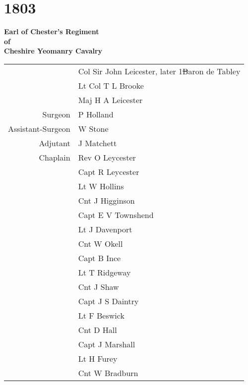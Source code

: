 \chapter*{1803}

\vspace*{10mm}

\begin{center}
  \Large
  \textbf{Earl of Chester's Regiment \\ of \\ Cheshire Yeomanry Cavalry}
\end{center}

\vspace*{10mm}

\begin{center}
  \begin{tabular}{rl}
    & Col Sir John Leicester, later 1\st Baron de Tabley \\
    & Lt Col T L Brooke \\
    & Maj H A Leicester \\
    Surgeon & P Holland \\
    Assistant-Surgeon & W Stone \\
    Adjutant & J Matchett \\
    Chaplain & Rev O Leycester \\
    & Capt R Leycester \\
    & Lt W Hollins \\
    & Cnt J Higginson \\
    & Capt E V Townshend \\
    & Lt J Davenport \\
    & Cnt W Okell \\
    & Capt B Ince \\
    & Lt T Ridgeway \\
    & Cnt J Shaw \\
    & Capt J S Daintry \\
    & Lt F Beswick \\
    & Cnt D Hall \\
    & Capt J Marshall \\
    & Lt H Furey \\
    & Cnt W Bradburn \\
  \end{tabular}
\end{center}

\vspace*{10mm}

\pagebreak

